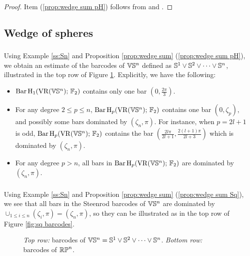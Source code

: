 \begin{proof}
	Item (\ref{prop:wedge sum pH}) follows from \cite[Proposition 3.7]{adamaszek2020homotopy} and \cite[Thoerem 6.1 (2)]{lim2020vietoris}.
	
\end{proof}

\subsection{Wedge of spheres}

\subsubsection{} Using Example \ref{ss:Sn} and Proposition \ref{prop:wedge sum} (\ref{prop:wedge sum pH}), we obtain an estimate of the barcodes of $\mathbb{V}\mathbb{S}^n$ defined as $\mathbb{S}^1 \vee \mathbb{S}^2 \vee \dots \vee \mathbb{S}^n$, illustrated in the top row of Figure \ref{fig:barcodes}.
Explicitly, we have the following:
\begin{itemize}
	\item $\operatorname{Bar} \operatorname{H}_{1}(\operatorname{VR}(\mathbb{V}\mathbb{S}^n);\,{\mathbb{F}_2})$ contains only one bar $(0,\tfrac{2\pi}{3})$.
	\item For any degree $2\leq p\leq n$, $\operatorname{Bar} \operatorname{H}_{p}(\operatorname{VR}(\mathbb{V}\mathbb{S}^n);\,{\mathbb{F}_2})$ contains one bar $(0,\zeta_p)$, and possibly some bars dominated by $(\zeta_n,\pi)$.
	For instance, when $p=2l+1$ is odd, $\operatorname{Bar} \operatorname{H}_{p}(\operatorname{VR}(\mathbb{V}\mathbb{S}^n);\,{\mathbb{F}_2})$ contains the bar $( \tfrac{2l\pi}{2l+1},\tfrac{2(l+1)\pi}{2l+3})$ which is dominated by $(\zeta_n,\pi)$.
	\item For any degree $p>n$, all bars in $\operatorname{Bar} \operatorname{H}_{p}(\operatorname{VR}(\mathbb{V}\mathbb{S}^n);\,{\mathbb{F}_2})$ are dominated by $(\zeta_n,\pi)$.
\end{itemize}

\subsubsection{} Using Example \ref{ss:Sn} and Proposition \ref{prop:wedge sum} (\ref{prop:wedge sum Sq}), we see that all bars in the Steenrod barcodes of $\mathbb{V}\mathbb{S}^n$ are dominated by $\cup_{1\leq i\leq n}(\zeta_i,\pi)=(\zeta_n,\pi)$, so they can be illustrated as in the top row of Figure \ref{fig:sq barcodes}.

\begin{figure}
	\centering
	
	\caption{\emph{Top row:} barcodes of $\mathbb{V}\mathbb{S}^n = \mathbb{S}^1 \vee \mathbb{S}^2 \vee \dots \vee \mathbb{S}^n$. \emph{Bottom row:} barcodes of $\mathbb{RP}^n$.}
	\label{fig:barcodes}
\end{figure}

